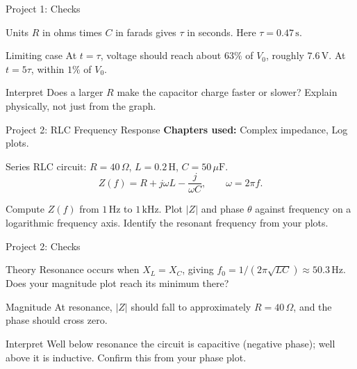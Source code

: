 \documentclass[9pt,aspectratio=169,xcolor=table]{beamer}
\begin{document}
\begin{frame}{Project 1: Checks}
    \leavevmode
    \begin{block}{Units}
        $R$ in ohms times $C$ in farads gives $\tau$ in seconds. Here
        $\tau = 0.47\,\text{s}$.
    \end{block}

    \vspace{2mm}
    \begin{block}{Limiting case}
        At $t = \tau$, voltage should reach about $63\%$ of $V_0$,
        roughly $7.6\,\text{V}$. At $t = 5\tau$, within $1\%$ of $V_0$.
    \end{block}

    \vspace{2mm}
    \begin{alertblock}{Interpret}
        Does a larger $R$ make the capacitor charge faster or slower?
        Explain \alert{physically}, not just from the graph.
    \end{alertblock}
\end{frame}

\begin{frame}{Project 2: RLC Frequency Response}
    \leavevmode
    \textbf{Chapters used:} Complex impedance, Log plots.

    \vspace{2mm}
    Series RLC circuit: $R = 40\,\Omega$, $L = 0.2\,\text{H}$,
    $C = 50\,\mu\text{F}$.
    \[
    Z(f) = R + j\omega L - \frac{j}{\omega C}, \qquad \omega = 2\pi f.
    \]

    \vspace{2mm}
    Compute $Z(f)$ from $1\,\text{Hz}$ to $1\,\text{kHz}$. Plot
    $|Z|$ and phase $\theta$ against frequency on a \alert{logarithmic}
    frequency axis. Identify the resonant frequency from your plots.
\end{frame}

\begin{frame}{Project 2: Checks}
    \leavevmode
    \begin{block}{Theory}
        Resonance occurs when $X_L = X_C$, giving
        $f_0 = 1/(2\pi\sqrt{LC}) \approx 50.3\,\text{Hz}$. Does your
        magnitude plot reach its minimum there?
    \end{block}

    \vspace{2mm}
    \begin{block}{Magnitude}
        At resonance, $|Z|$ should fall to approximately
        $R = 40\,\Omega$, and the phase should cross zero.
    \end{block}

    \vspace{2mm}
    \begin{alertblock}{Interpret}
        Well below resonance the circuit is capacitive (negative phase);
        well above it is inductive. Confirm this from your phase plot.
    \end{alertblock}
\end{frame}
\end{document}
